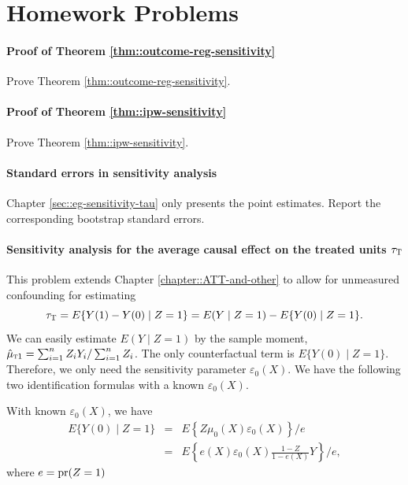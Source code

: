 \section{Homework Problems}


\paragraph{Proof of Theorem \ref{thm::outcome-reg-sensitivity}}\label{hw::proof-theorem-1-sa}

Prove Theorem \ref{thm::outcome-reg-sensitivity}. 

\paragraph{Proof of Theorem \ref{thm::ipw-sensitivity}}\label{hw::proof-theorem-2-sa}

Prove Theorem \ref{thm::ipw-sensitivity}. 


\paragraph{Standard errors in sensitivity analysis}\label{hw::sensitivity-se}

Chapter \ref{sec::eg-sensitivity-tau} only presents the point estimates. Report the corresponding bootstrap standard errors. 

  


\paragraph{Sensitivity analysis for the average causal effect on the treated units $\tau_\textsc{T}$}\label{hw::att-sentivity-analysis}

This problem extends Chapter \ref{chapter::ATT-and-other} to allow for unmeasured confounding for estimating
$$
\tau_\textsc{T} = E\{  Y(1) - Y(0)  \mid Z=1  \} 
= E(Y\mid Z=1) - E\{  Y(0)  \mid Z=1  \} .
$$
We can easily estimate $E(Y\mid Z=1)$ by the sample moment, $\hat{\mu}_{\textsc{t}1} =   \sum_{i=1}^n Z_i Y_i / \sum_{i=1}^n Z_i$. The only counterfactual term is $E\{  Y(0)  \mid Z=1  \}$. Therefore, we only need the sensitivity parameter $ \varepsilon_0(X) $. We have the following two identification formulas with a known  $\varepsilon_0(X) .$

\begin{theorem}
\label{thm::att-reg-ipw}
With known $\varepsilon_0(X) $, we have 
 \begin{eqnarray*}
E\{  Y(0)  \mid Z=1  \}  &=& E\left\{  Z \mu_0(X)  \varepsilon_0(X)    \right\} /e \\
&=& E\left\{  e(X)\varepsilon_0(X) \frac{ 1-Z}{1-e(X)}  Y      \right\} /e,
\end{eqnarray*}
where $e = \textup{pr}(Z=1)$
\end{theorem}


